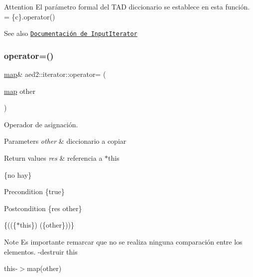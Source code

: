 \begin{DoxyAttention}{Attention}
El parámetro formal  del T\+AD diccionario se establece en esta función.  = \{c\}.operator()
\end{DoxyAttention}
\begin{DoxySeeAlso}{See also}
\href{http://en.cppreference.com/w/cpp/concept/InputIterator}{\tt Documentación de Input\+Iterator} 
\end{DoxySeeAlso}
\mbox{\label{classaed2_1_1iterator_a7cafd02350b04f7546fa29c17168c18b}} 
\subsubsection{\texorpdfstring{operator=()}{operator=()}}
{\footnotesize\ttfamily \hyperlink{classaed2_1_1map}{map}\& aed2\+::iterator\+::operator= (\begin{DoxyParamCaption}\item[{\hyperlink{classaed2_1_1map}{map}}]{other }\end{DoxyParamCaption})\hspace{0.3cm}{\ttfamily [inline]}}



Operador de asignación. 


\begin{DoxyParams}{Parameters}
{\em other} & diccionario a copiar \\
\hline
\end{DoxyParams}

\begin{DoxyRetVals}{Return values}
{\em res} & referencia a $\ast$this\\
\hline
\end{DoxyRetVals}
\{no hay\}

\begin{DoxyPrecond}{Precondition}
\{true\} 
\end{DoxyPrecond}
\begin{DoxyPostcond}{Postcondition}
\{res  other\}
\end{DoxyPostcond}
\{((\{$\ast$this\})  (\{other\}))\}

\begin{DoxyNote}{Note}
Es importante remarcar que no se realiza ninguna comparación entre los elementos. -\/destruir this
\begin{DoxyItemize}
\item this-\/$>$map(other) 
\end{DoxyItemize}
\end{DoxyNote}
\mbox{\label{classaed2_1_1iterator_af74d214f3278d8cd6b3a5a721e173fa3}} 
